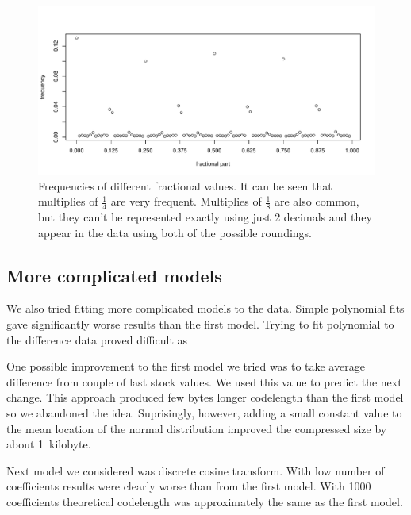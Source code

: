 \documentclass{article}
\begin{document}
\begin{figure}
    \includegraphics[scale=0.5]{frac.pdf}
    \caption{Frequencies of different fractional values. It can be seen that multiplies of $\frac{1}{4}$ are very frequent. Multiplies of $\frac{1}{8}$ are also common, but they can't be represented exactly using just 2 decimals and they appear in the data using both of the possible roundings.}
    \label{fig:frac}
\end{figure}

\subsection {More complicated models}
We also tried fitting more complicated models to the data.
Simple polynomial fits gave significantly worse results than the first model.
Trying to fit polynomial to the difference data proved difficult as

One possible improvement to the first model we tried was to take average difference
from couple of last stock values. We used this value to predict the next change.
This approach produced few bytes longer codelength than the first model so we
abandoned the idea.
Suprisingly, however, adding a small constant value to the mean location of the normal distribution improved the compressed size by about 1~kilobyte.

Next model we considered was discrete cosine transform.
With low number of coefficients results were clearly worse than from the first model.
With 1000 coefficients theoretical codelength was approximately the same as the first model.
\end{document}
